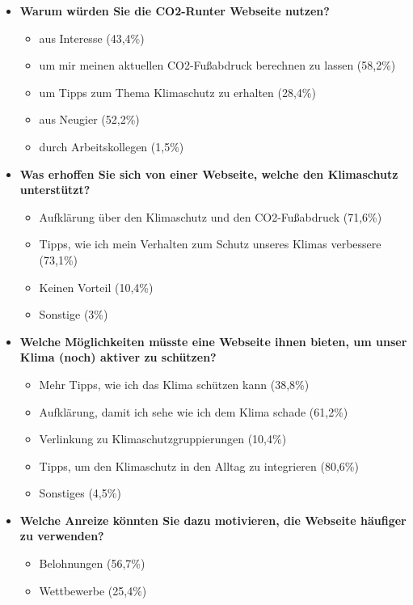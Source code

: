 \begin{itemize}
    \item \textbf{Warum würden Sie die CO2-Runter Webseite nutzen?}
          \begin{itemize}
              \item aus Interesse (43,4\%)
              \item um mir meinen aktuellen CO2-Fußabdruck berechnen zu lassen (58,2\%)
              \item um Tipps zum Thema Klimaschutz zu erhalten (28,4\%)
              \item aus Neugier (52,2\%)
              \item durch Arbeitskollegen (1,5\%)
          \end{itemize}
    \item \textbf{Was erhoffen Sie sich von einer Webseite, welche den Klimaschutz unterstützt?}
          \begin{itemize}
              \item Aufklärung über den Klimaschutz und den CO2-Fußabdruck (71,6\%)
              \item Tipps, wie ich mein Verhalten zum Schutz unseres Klimas verbessere (73,1\%)
              \item Keinen Vorteil (10,4\%)
              \item Sonstige (3\%)
          \end{itemize}
    \item \textbf{Welche Möglichkeiten müsste eine Webseite ihnen bieten, um unser Klima (noch) aktiver zu schützen?}
          \begin{itemize}
              \item Mehr Tipps, wie ich das Klima schützen kann (38,8\%)
              \item Aufklärung, damit ich sehe wie ich dem Klima schade (61,2\%)
              \item Verlinkung zu Klimaschutzgruppierungen (10,4\%)
              \item Tipps, um den Klimaschutz in den Alltag zu integrieren (80,6\%)
              \item Sonstiges (4,5\%)
          \end{itemize}
    \item \textbf{Welche Anreize könnten Sie dazu motivieren, die Webseite häufiger zu verwenden?}
          \begin{itemize}
              \item Belohnungen (56,7\%)
              \item Wettbewerbe (25,4\%)

\end{itemize}
\end{itemize}
